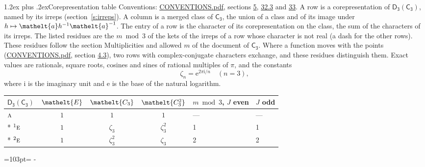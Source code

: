 \documentclass[10pt,a4paper]{article}
\makeatletter
\renewcommand\section{\@startsection{section}{1}{\z@}{-3ex plus -1ex minus -.2ex}%
  {1.2ex plus .2ex}{\normalfont\large\sffamily\bfseries\color{parttitle}}}
\newcommand{\needspace}[1]{\par\penalty-100\begingroup\dimen0=#1\relax\dimen2=\pagegoal
  \advance\dimen2-\pagetotal\ifdim\dimen0>\dimen2\relax\ifdim\dimen2>0pt\vfil\break\fi\fi
  \endgroup}
\numberwithin{equation}{section}
\newcommand{\eltfont}[1]{{\let\sigma\eltsigma\mathelt{#1}}}
\newcommand{\grp}[1]{\mathsf{#1}}
\newcommand{\irr}[1]{\text{\normalfont\scshape #1}}
\newcommand{\conjpair}[1]{{}^{#1}}
\newcommand{\cls}[1]{\eltfont{#1}}
\newcommand{\elt}[1]{\eltfont{#1}}
\newcommand{\iunit}{\mathrm{i}}
\newcommand{\expe}{\mathrm{e}}
\newcommand{\rootunity}[1]{\zeta_{#1}}
\makeatother
\begin{document}
\section{Corepresentation table}\label{s:character_table}
Conventions: \href{../../CONVENTIONS.pdf}{CONVENTIONS.pdf}, sections \href{../../../rotation/CONVENTIONS.pdf\#conv.5}{5}, \href{../../CONVENTIONS.pdf\#conv.32.3}{32.3} and \href{../../CONVENTIONS.pdf\#conv.33}{33}.
A row is a corepresentation of $\grp{D_{3}}(\grp{C_{3}})$, named by its irreps (section~\ref{s:irreps}). A column is a merged class of $\grp{C_{3}}$, the union of a class and of its image under $h \mapsto \elt{a} h^{-1} \elt{a}^{-1}$. The entry of a row is the character of its corepresentation on the class, the sum of the characters of its irreps.
\leavevmode\label{n:head.parity}The listed residues are the $m \bmod 3$ of the kets of the irreps of a row whose character is not real (a dash for the other rows). These residues follow the section Multiplicities and allowed $m$ of the document of \href{../../../rotation/data/pdf/C3.pdf}{$\grp{C_{3}}$}. Where a function moves with the points (\href{../../CONVENTIONS.pdf}{CONVENTIONS.pdf}, section \href{../../../rotation/CONVENTIONS.pdf\#conv.4.3}{4.3}), two rows with complex-conjugate characters exchange, and these residues distinguish them.
\leavevmode\label{n:constant.root}\label{n:index.root.order}Exact values are rationals, square roots, cosines and sines of rational multiples of $\pi$, and the constants
\begin{equation}\label{e:constants}\rootunity{n} = \expe^{2\pi\iunit/n}\quad(n = 3),\end{equation}
where $\iunit$ is the imaginary unit and $\expe$ is the base of the natural logarithm.
{\small\setlength{\tabcolsep}{4pt}\begin{longtable}{@{}lcccll@{}}\toprule
$\grp{D_{3}}(\grp{C_{3}})$ & $\cls{E}$ & $\cls{C_{3}}$ & $\cls{C_{3}^{2}}$ & $m \bmod 3$, $J$ even & $J$ odd\\\midrule\endhead
\bottomrule\endfoot\endlastfoot
$\irr{a}$ & $1$ & $1$ & $1$ & --- & ---\\*
$\conjpair{1}\irr{e}$ & $1$ & $\rootunity{3}$ & $\rootunity{3}^{2}$ & 1 & 1\\*
$\conjpair{2}\irr{e}$ & $1$ & $\rootunity{3}^{2}$ & $\rootunity{3}$ & 2 & 2\\
\bottomrule\end{longtable}}
\needspace{103pt}
\end{document}
